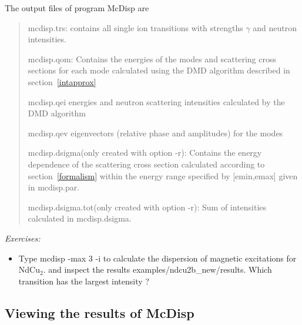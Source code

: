 The output files of program {\prg McDisp} are 

\begin{quote}
\item[{\prg mcdisp.trs}:] contains all single ion transitions with strengths $\gamma$ 
and neutron intensities.
\item [{\prg mcdisp.qom}:] Contains the energies of the modes and scattering cross sections  for each mode 
calculated using the DMD algorithm described in section~\ref{intapprox}
\item[{\prg mcdisp.qei}] energies and neutron scattering intensities calculated by the DMD algorithm
\item[{\prg mcdisp.qev}] eigenvectors (relative phase and amplitudes) for the modes
\item [{\prg mcdisp.dsigma}(only created with option {\prg -r}):] Contains the energy dependence of the scattering cross %
section
calculated according to section~\ref{formalism} within the energy range specified by [emin,emax] given in {\prg %
mcdisp.par}. 
\item [{\prg mcdisp.dsigma.tot}(only created with option {\prg -r}):] Sum of intensities calculated in {\prg %
mcdisp.dsigma}.
\end{quote}

\vspace{1cm}
{\em Exercises:}
\begin{itemize}
\item Type {\prg mcdisp -max 3 -i} to
calculate the dispersion of magnetic excitations for NdCu$_2$.
and inspect the results
{\prg examples/ndcu2b\_new/results}.
Which  transition has the largest intensity ?
\end{itemize}

\subsection{Viewing the results of McDisp}

